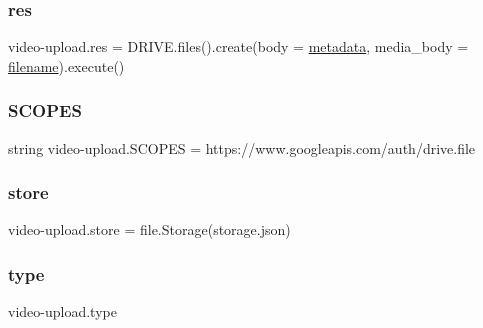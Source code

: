 \subsubsection{\texorpdfstring{res}{res}}
{\footnotesize\ttfamily video-\/upload.\+res = D\+R\+I\+V\+E.\+files().create(body = \hyperlink{namespacevideo-upload_a078e77756bf147602ea81c2485e0b3ca}{metadata}, media\+\_\+body = \hyperlink{namespacevideo-upload_a8f0c224b0d6326d66b6a471fb3ae06b7}{filename}).execute()}

\mbox{\label{namespacevideo-upload_a76e331163a34b55da69ecdf6ca084eab}} 
\subsubsection{\texorpdfstring{S\+C\+O\+P\+ES}{SCOPES}}
{\footnotesize\ttfamily string video-\/upload.\+S\+C\+O\+P\+ES = \textquotesingle{}https\+://www.\+googleapis.\+com/auth/drive.\+file\textquotesingle{}}

\mbox{\label{namespacevideo-upload_a1bbb99b1568829c7cb6af40564c671d3}} 
\subsubsection{\texorpdfstring{store}{store}}
{\footnotesize\ttfamily video-\/upload.\+store = file.\+Storage(\textquotesingle{}storage.\+json\textquotesingle{})}

\mbox{\label{namespacevideo-upload_a0aea8bad307fcc1764683855862406c5}} 
\subsubsection{\texorpdfstring{type}{type}}
{\footnotesize\ttfamily video-\/upload.\+type}

